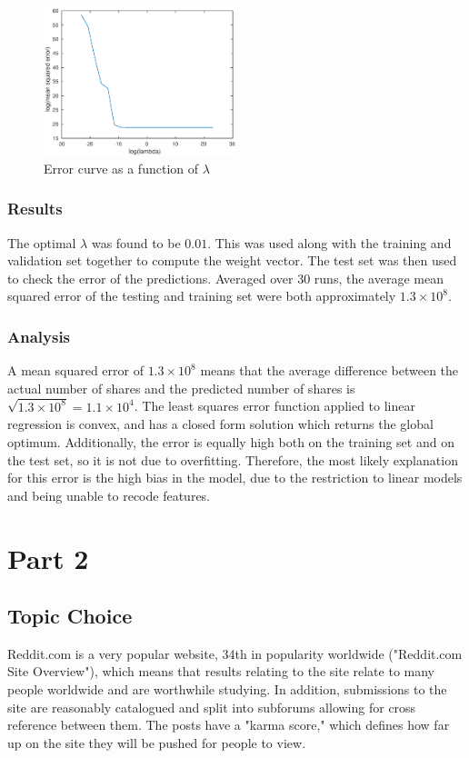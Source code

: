 \documentclass[10pt,twocolumn]{article}
\begin{document}
\begin{figure}[htpb]
	\centering
	\includegraphics[width=0.5\textwidth]{part1-error-curve}
	\caption{Error curve as a function of $\lambda$}
	\label{fig:ecurve1-lambda}
\end{figure}

\subsubsection{Results}

The optimal $\lambda$ was found to be $0.01$.
This was used along with the training and validation set together to compute the weight vector.
The test set was then used to check the error of the predictions.
Averaged over $30$ runs, the average mean squared error of the testing and training set were both approximately $1.3\times 10^8$.

\subsubsection{Analysis}

A mean squared error of $1.3\times 10^8$ means that the average difference between the actual number of shares and the predicted number of shares is $\sqrt{1.3\times 10^8} = 1.1\times 10^4$.
The least squares error function applied to linear regression is convex, and has a closed form solution which returns the global optimum.
Additionally, the error is equally high both on the training set and on the test set, so it is not due to overfitting.
Therefore, the most likely explanation for this error is the high bias in the model, due to the restriction to linear models and being unable to recode features.

\section{Part 2}

\subsection{Topic Choice}
Reddit.com is a very popular website, 34th in popularity worldwide ("Reddit.com Site Overview"), which means that results relating to the site relate to many people worldwide and are worthwhile studying. In addition, submissions to the site are reasonably catalogued and split into subforums allowing for cross reference between them. The posts have a "karma score," which defines how far up on the site they will be pushed for people to view.
\end{document}
